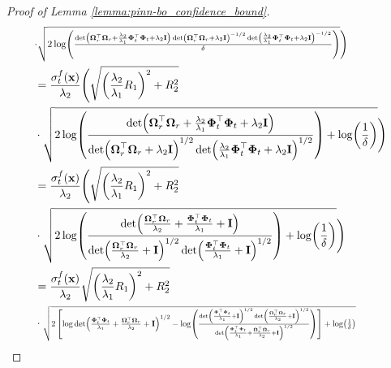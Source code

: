 \begin{proof}[Proof of Lemma \ref{lemma:pinn-bo_confidence_bound}]
\begin{align*}
                 & \resizebox{0.8\textwidth}{!}{$\cdot \sqrt{2\log(\frac{\det(\boldsymbol{\Omega}_r^\top \boldsymbol{\Omega}_r + \frac{\lambda_2}{\lambda_1}\boldsymbol{\Phi}_t^\top\boldsymbol{\Phi}_t + \lambda_2\mathbf{I})\det(\boldsymbol{\Omega}_r^\top\boldsymbol{\Omega}_r + \lambda_2\mathbf{I})^{-1/2}\det(\frac{\lambda_2}{\lambda_1}\boldsymbol{\Phi}_t^\top\boldsymbol{\Phi}_t + \lambda_2\mathbf{I})^{-1/2}}{\delta})}\Bigg)$} 
                 \\
                 & = \frac{\sigma_t^f(\mathbf{x})}{\lambda_2} \Bigg(\sqrt{\left(\frac{\lambda_2}{\lambda_1}R_1\right)^2 + R_2^2} \notag \\
                 & \cdot\sqrt{2\log(\frac{\det(\boldsymbol{\Omega}_r^\top \boldsymbol{\Omega}_r + \frac{\lambda_2}{\lambda_1}\boldsymbol{\Phi}_t^\top\boldsymbol{\Phi}_t + \lambda_2\mathbf{I})}{\det(\boldsymbol{\Omega}_r^\top\boldsymbol{\Omega}_r + \lambda_2\mathbf{I})^{1/2}\det(\frac{\lambda_2}{\lambda_1}\boldsymbol{\Phi}_t^\top\boldsymbol{\Phi}_t + \lambda_2\mathbf{I})^{1/2}}) + \log(\frac{1}{\delta})}\Bigg) 
                 \\
                 & = \frac{\sigma_t^f(\mathbf{x})}{\lambda_2} \Bigg(\sqrt{\left(\frac{\lambda_2}{\lambda_1}R_1\right)^2 + R_2^2} \notag \\
                 & \cdot \sqrt{2\log(\frac{\det( \frac{\boldsymbol{\Omega}_r^\top \boldsymbol{\Omega}_r}{\lambda_2} + \frac{\boldsymbol{\Phi}_t^\top\boldsymbol{\Phi}_t}{\lambda_1} + \mathbf{I})}{\det( \frac{\boldsymbol{\Omega}_r^\top\boldsymbol{\Omega}_r}{\lambda_2} + \mathbf{I})^{1/2}\det(\frac{\boldsymbol{\Phi}_t^\top\boldsymbol{\Phi}_t}{\lambda_1} + \mathbf{I})^{1/2}}) + \log(\frac{1}{\delta})}\Bigg) 
                 \\
                 & =  \frac{\sigma_t^f(\mathbf{x})}{\lambda_2} \sqrt{\left(\frac{\lambda_2}{\lambda_1}R_1\right)^2 + R_2^2} \notag \\
                 & \cdot \resizebox{0.8\textwidth}{!}{$\sqrt{2 \left[\log \det(\frac{\boldsymbol{\Phi}_t^\top \boldsymbol{\Phi}_t}{\lambda_1} + \frac{\boldsymbol{\Omega}_r^\top \boldsymbol{\Omega}_r}{\lambda_2} + \mathbf{I})^{1/2}  - \log (\frac{\det(\frac{\boldsymbol{\Phi}_t^\top \boldsymbol{\Phi}_t}{\lambda_1} + \mathbf{I})^{1/2}\det(\frac{\boldsymbol{\Omega}_r^\top \boldsymbol{\Omega}_r}{\lambda_2} + \mathbf{I})^{1/2}}{\det(\frac{\boldsymbol{\Phi}_t^\top \boldsymbol{\Phi}_t}{\lambda_1} + \frac{\boldsymbol{\Omega}_r^\top \boldsymbol{\Omega}_r}{\lambda_2} + \mathbf{I})^{1/2}}) \right] + \log(\frac{1}{\delta})}$}
                 \\

\end{align*}
\end{proof}
